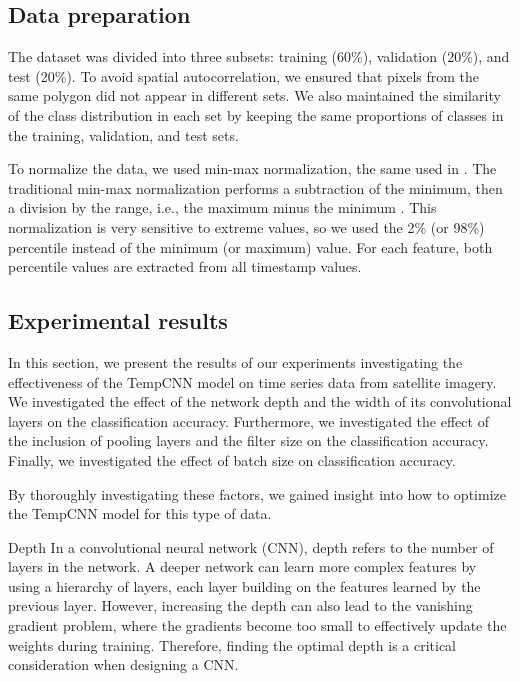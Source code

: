\subsection{Data preparation}
\label{sec:tempCNNDataPreparation}

The dataset was divided into three subsets: training (60\%), validation (20\%), and test (20\%).
To avoid spatial autocorrelation, we ensured that pixels from the same polygon did not appear in different sets.
We also maintained the similarity of the class distribution in each set by keeping the same proportions of classes in the training, validation, and test sets.

To normalize the data, we used min-max normalization, the same used in \cite{tempCNN}.
The traditional min-max normalization performs a subtraction of the minimum, then a division by the range, i.e., the maximum minus the minimum \cite{han2011data}.
This normalization is very sensitive to extreme values, so we used the 2\% (or 98\%) percentile instead of the minimum (or maximum) value. 
For each feature, both percentile values are extracted from all timestamp values.

\subsection{Experimental results}

In this section, we present the results of our experiments investigating the effectiveness of the TempCNN model on time series data from satellite imagery.
We investigated the effect of the network depth and the width of its convolutional layers on the classification accuracy. 
Furthermore, we investigated the effect of the inclusion of pooling layers and the filter size on the classification accuracy. 
Finally, we investigated the effect of batch size on classification accuracy. 

By thoroughly investigating these factors, we gained insight into how to optimize the TempCNN model for this type of data.


\begin{paragraph}{Depth}
  In a convolutional neural network (CNN), depth refers to the number of layers in the network.
  A deeper network can learn more complex features by using a hierarchy of layers, each layer building on the features learned by the previous layer.
  However, increasing the depth can also lead to the vanishing gradient problem, where the gradients become too small to effectively update the weights during training.
  Therefore, finding the optimal depth is a critical consideration when designing a CNN.
\end{paragraph}

